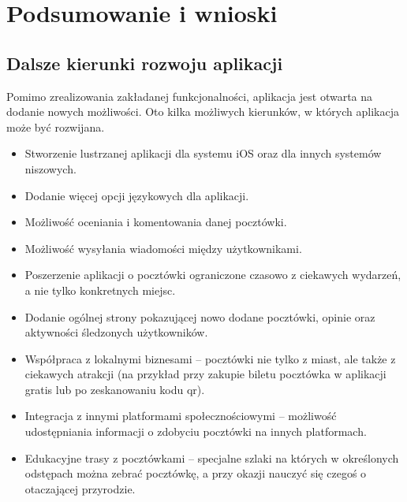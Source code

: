 \documentclass[a4paper,twoside,12pt]{book}
\begin{document}





\chapter{Podsumowanie i wnioski}
\label{ch:Podsumowanie}

\section{Dalsze kierunki rozwoju aplikacji}
Pomimo zrealizowania zakładanej funkcjonalności, aplikacja jest otwarta na dodanie nowych możliwości. Oto kilka możliwych kierunków, w których aplikacja może być rozwijana.
\begin{itemize}
    \item Stworzenie lustrzanej aplikacji dla systemu iOS oraz dla innych systemów niszowych.
    \item Dodanie więcej opcji językowych dla aplikacji.
    \item Możliwość oceniania i komentowania danej pocztówki.
    \item Możliwość wysyłania wiadomości między użytkownikami.
    \item Poszerzenie aplikacji o pocztówki ograniczone czasowo z ciekawych wydarzeń, a nie tylko konkretnych miejsc.
    \item Dodanie ogólnej strony pokazującej nowo dodane pocztówki, opinie oraz aktywności śledzonych użytkowników.
    \item Współpraca z lokalnymi biznesami -- pocztówki nie tylko z miast, ale także z ciekawych atrakcji (na przykład przy zakupie biletu pocztówka w aplikacji gratis lub po zeskanowaniu kodu qr).
    \item Integracja z innymi platformami społecznościowymi -- możliwość udostępniania informacji o zdobyciu pocztówki na innych platformach.
    \item Edukacyjne trasy z pocztówkami -- specjalne szlaki na których w określonych odstępach można zebrać pocztówkę, a przy okazji nauczyć się czegoś o otaczającej przyrodzie.
\end{itemize}
\end{document}
